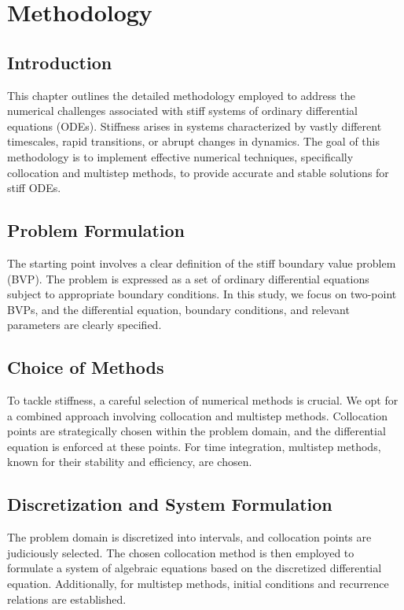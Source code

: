 \chapter{Methodology}

\section{Introduction}

This chapter outlines the detailed methodology employed to address the numerical challenges associated with stiff systems of ordinary differential equations (ODEs). Stiffness arises in systems characterized by vastly different timescales, rapid transitions, or abrupt changes in dynamics. The goal of this methodology is to implement effective numerical techniques, specifically collocation and multistep methods, to provide accurate and stable solutions for stiff ODEs.

\section{Problem Formulation}

The starting point involves a clear definition of the stiff boundary value problem (BVP). The problem is expressed as a set of ordinary differential equations subject to appropriate boundary conditions. In this study, we focus on two-point BVPs, and the differential equation, boundary conditions, and relevant parameters are clearly specified.

\section{Choice of Methods}

To tackle stiffness, a careful selection of numerical methods is crucial. We opt for a combined approach involving collocation and multistep methods. Collocation points are strategically chosen within the problem domain, and the differential equation is enforced at these points. For time integration, multistep methods, known for their stability and efficiency, are chosen.

\section{Discretization and System Formulation}

The problem domain is discretized into intervals, and collocation points are judiciously selected. The chosen collocation method is then employed to formulate a system of algebraic equations based on the discretized differential equation. Additionally, for multistep methods, initial conditions and recurrence relations are established.

